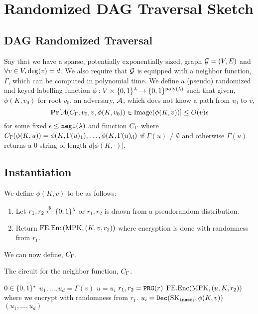 \section{Randomized DAG Traversal Sketch}
\newcommand{\labelFunc}{\phi}
\newcommand{\imageFn}{\text{Image}}
\newcommand{\pathSuffix}{\text{Suff}}

\subsection{DAG Randomized Traversal}
Say that we have a sparse, potentially exponentially sized, graph $\mathcal{G} = (V, E)$
and $\forall v \in V, \deg(v) = d$.
We also require that $\mathcal{G}$ is equipped with a neighbor function, $\Gamma$, which can be computed in polynomial time.
We define a (pseudo) randomized and keyed labelling function $\phi: V \times \{0,1\}^\lambda \rightarrow \{0,1\}^{\operatorname{poly}(\lambda)}$ 
such that given, $\phi(K, v_0)$ for root $v_0$, an adversary, $\mathcal{A}$, which does not know a path from $v_0$ to $v$,
\begin{equation}
	\label{eq:guessPhi}
	\Pr[\advers(\circNeigb, v_0, v, \labelFunc(K, v_0)) \in \imageFn(\labelFunc(K, v))] \leq O(v)\eps
\end{equation}
for some fixed $\epsilon \leq \texttt{negl}(\lambda)$ and function $C_\Gamma$ where $\circNeigb(\labelFunc(K, u)) = \labelFunc(K, \Gamma(u)_1), \dots, \labelFunc(K, \Gamma(u)_d)$
if $\Gamma(u) \neq \emptyset$ and otherwise $\Gamma(u)$ returns a $0$ string of length $d |\labelFunc(K, \cdot)|$.

\subsection{Instantiation}
We define $\labelFunc(K, v)$ to be as follows:
\begin{enumerate}
	\item Let $r_1, r_2 \overset{\$}{\gets} \{0,1\}^\lambda$ or $r_1, r_2$ is drawn from a pseudorandom distribution. %
	\item Return $\text{FE.Enc}(\text{MPK}, (K, v, r_2))$ where encryption is done with randomness from $r_1$.
\end{enumerate}

We can now define, $C_\Gamma$.
\begin{algorithm}[H]
	\caption{
		The circuit for the neighbor function, $C_\Gamma$.
	}
	\begin{algorithmic}[1]
				\State \Return $0 \in \{0,1\}^*$ %
			\EndIf
			\State $u_1, \dots, u_d = \Gamma(v)$
			\State $u = u_i$
			\State $r_1, r_2 = \texttt{PRG}(r)$
			\label{alg:neighb:prg}
			\State \Return $\text{FE.Enc}(\text{MPK}, (u, K, r_2))$ where we encrypt with randomness from $r_1$.
		\EndFunction
				\State $u_i = \texttt{Dec}(\text{SK}_{\texttt{inner}_i}, \phi(K, v))$
			\EndFor
			\State \Return $(u_1, \dots, u_d)$
		\EndFunction
	\end{algorithmic}
	\label{alg:neighb}
\end{algorithm}


